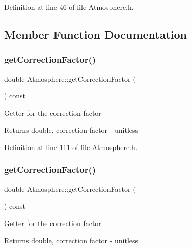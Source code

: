 Definition at line 46 of file Atmosphere.\+h.



\subsection{Member Function Documentation}
\mbox{\label{class_atmosphere_a79c94343c7b6659b2f79688a1ba69aed}} 
\subsubsection{\texorpdfstring{get\+Correction\+Factor()}{getCorrectionFactor()}\hspace{0.1cm}{\footnotesize\ttfamily [1/3]}}
{\footnotesize\ttfamily double Atmosphere\+::get\+Correction\+Factor (\begin{DoxyParamCaption}{ }\end{DoxyParamCaption}) const\hspace{0.3cm}{\ttfamily [inline]}}

Getter for the correction factor \begin{DoxyReturn}{Returns}
double, correction factor -\/ unitless 
\end{DoxyReturn}


Definition at line 111 of file Atmosphere.\+h.

\mbox{\label{class_atmosphere_a79c94343c7b6659b2f79688a1ba69aed}} 
\subsubsection{\texorpdfstring{get\+Correction\+Factor()}{getCorrectionFactor()}\hspace{0.1cm}{\footnotesize\ttfamily [2/3]}}
{\footnotesize\ttfamily double Atmosphere\+::get\+Correction\+Factor (\begin{DoxyParamCaption}{ }\end{DoxyParamCaption}) const\hspace{0.3cm}{\ttfamily [inline]}}

Getter for the correction factor \begin{DoxyReturn}{Returns}
double, correction factor -\/ unitless 
\end{DoxyReturn}


